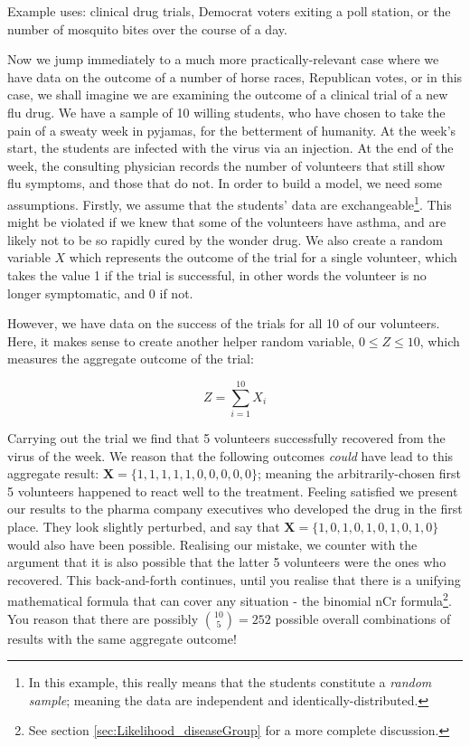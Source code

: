\documentclass[11pt,fullpage]{book}
\begin{document}
Example uses: clinical drug trials, Democrat voters exiting a poll station, or the number of mosquito bites over the course of a day.

Now we jump immediately to a much more practically-relevant case where we have data on the outcome of a number of horse races, Republican votes, or in this case, we shall imagine we are examining the outcome of a clinical trial of a new flu drug. We have a sample of 10 willing students, who have chosen to take the pain of a sweaty week in pyjamas, for the betterment of humanity. At the week's start, the students are infected with the virus via an injection. At the end of the week, the consulting physician records the number of volunteers that still show flu symptoms, and those that do not. In order to build a model, we need some assumptions. Firstly, we assume that the students' data are exchangeable\footnote{In this example, this really means that the students constitute a \textit{random sample}; meaning the data are independent and identically-distributed.}. This might be violated if we knew that some of the volunteers have asthma, and are likely not to be so rapidly cured by the wonder drug. We also create a random variable $X$ which represents the outcome of the trial for a single volunteer, which takes the value 1 if the trial is successful, in other words the volunteer is no longer symptomatic, and 0 if not.

However, we have data on the success of the trials for all 10 of our volunteers. Here, it makes sense to create another helper random variable, $0\leq Z\leq 10$, which measures the aggregate outcome of the trial:

\begin{equation}
Z = \sum\limits_{i=1}^{10} X_i
\end{equation}

Carrying out the trial we find that 5 volunteers successfully recovered from the virus of the week. We reason that the following outcomes \textit{could} have lead to this aggregate result: $\boldsymbol{X} = \{1,1,1,1,1,0,0,0,0,0\}$; meaning the arbitrarily-chosen first 5 volunteers happened to react well to the treatment. Feeling satisfied we present our results to the pharma company executives who developed the drug in the first place. They look slightly perturbed, and say that $\boldsymbol{X} = \{1,0,1,0,1,0,1,0,1,0\}$ would also have been possible. Realising our mistake, we counter with the argument that it is also possible that the latter 5 volunteers were the ones who recovered. This back-and-forth continues, until you realise that there is a unifying mathematical formula that can cover any situation - the binomial nCr formula\footnote{See section \ref{sec:Likelihood_diseaseGroup} for a more complete discussion.}. You reason that there are possibly ${10 \choose 5}=252$  possible overall combinations of results with the same aggregate outcome!
\end{document}
